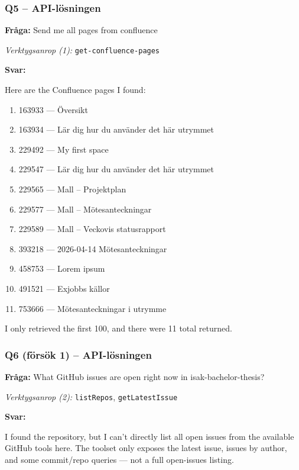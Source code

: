 \clearpage
\subsubsection*{Q5 -- API-lösningen}\label{fig:api_q5}

\textbf{Fråga:} Send me all pages from confluence

\medskip
\textit{Verktygsanrop (1):} \texttt{get-confluence-pages}

\medskip
\textbf{Svar:}

Here are the Confluence pages I found:

\begin{enumerate}
    \item 163933 --- Översikt
    \item 163934 --- Lär dig hur du använder det här utrymmet
    \item 229492 --- My first space
    \item 229547 --- Lär dig hur du använder det här utrymmet
    \item 229565 --- Mall -- Projektplan
    \item 229577 --- Mall -- Mötesanteckningar
    \item 229589 --- Mall -- Veckovis statusrapport
    \item 393218 --- 2026-04-14 Mötesanteckningar
    \item 458753 --- Lorem ipsum
    \item 491521 --- Exjobbs källor
    \item 753666 --- Mötesanteckningar i utrymme
\end{enumerate}

I only retrieved the first 100, and there were 11 total returned.

\clearpage
\subsubsection*{Q6 (försök 1) -- API-lösningen}\label{fig:api_q6_1}

\textbf{Fråga:} What GitHub issues are open right now in isak-bachelor-thesis?

\medskip
\textit{Verktygsanrop (2):} \texttt{listRepos}, \texttt{getLatestIssue}

\medskip
\textbf{Svar:}

I found the repository, but I can't directly list all open issues from the available GitHub tools here. The toolset only exposes the latest issue, issues by author, and some commit/repo queries --- not a full open-issues listing.

